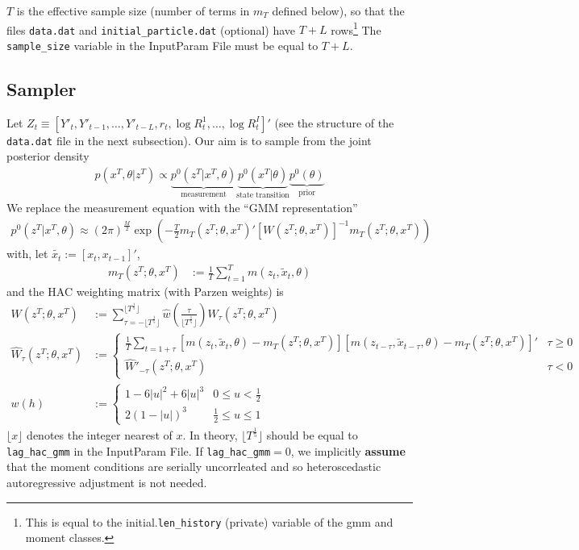 \documentclass[11pt, letterpaper, notitlepage]{article}
\begin{document}
$T$ is the effective sample size (number of terms in $m_T$ defined below), so that the files \texttt{data.dat} and \texttt{initial\_particle.dat} (optional) have $T+L$ rows\footnote{This is equal to the initial.\texttt{len\_history} (private) variable of the gmm and moment classes.} The \texttt{sample\_size} variable in the InputParam File must be equal to $T+L$.

\pagebreak 

\subsection{Sampler}

\noindent Let $Z_t \equiv [Y'_{t}, Y'_{t-1}, \dots, Y'_{t-L}, r_t, \log R_{t}^1, \dots, \log R_{t}^I]'$ (see the structure of the \texttt{data.dat} file in the next subsection). Our aim is to sample from the joint posterior density 
\begin{align*}
p(x^T, \theta | z^T) \propto \underbrace{p^0(z^T | x^T, \theta)}_{\text{measurement}}\underbrace{p^0(x^T|\theta)}_{\text{state transition}}\underbrace{p^0(\theta)}_{\text{prior}}
\end{align*}
We replace the measurement equation with the ``GMM representation''
\begin{align*}
p^0(z^T | x^T, \theta) \approx (2\pi)^{\frac{M}{2}}\exp\left(-\frac{T}{2} m_T(z^T; \theta, x^T)'[W(z^T;\theta, x^T)]^{-1}m_T(z^T; \theta, x^T)\right)
\end{align*}
with, let $\tilde{x_t}:=[x_t, x_{t-1}]'$, 
\begin{align*}
m_T(z^T; \theta, x^T) &:=  \frac{1}{T}\sum_{t=1}^T m(z_t, \tilde{x}_t, \theta) 
\end{align*}
and the HAC weighting matrix (with Parzen weights) is
\begin{align*}
W(z^T;\theta, x^T) &:= \sum_{\tau = - \lfloor T^{\frac{1}{5}}\rfloor}^{\lfloor T^{\frac{1}{5}}\rfloor} \widehat w\left(\frac{\tau}{\lfloor T^{\frac{1}{5}}\rfloor}\right)W_{\tau}(z^T; \theta, x^T) \\
\widehat W_{\tau}(z^T; \theta, x^T) &:= \left\{ \begin{array}{ll}
\frac{1}{T}\sum_{t=1+\tau}\left[m(z_t, \tilde{x}_t, \theta) - m_T(z^T; \theta, x^T)\right]\left[m(z_{t-\tau}, \tilde{x}_{t-\tau}, \theta) - m_T(z^T; \theta, x^T)\right]' & \tau\geq 0 \\
\widehat W'_{-\tau}(z^T; \theta, x^T) & \tau<0
\end{array}\right. \\
w(h) &:= \left\{ \begin{array}{ll}
1 - 6|u|^2 + 6|u|^3 & 0 \leq u < \frac{1}{2} \\
2(1-|u|)^3 & \frac{1}{2}\leq u \leq 1
\end{array}\right. 
\end{align*}
$\lfloor x \rfloor$ denotes the integer nearest of $x$. In theory, $\lfloor T^{\frac{1}{5}} \rfloor$ should be equal to \texttt{lag\_hac\_gmm} in the InputParam File. If \texttt{lag\_hac\_gmm}$=0$, we implicitly \textbf{assume} that the moment conditions are serially uncorrleated and so heteroscedastic autoregressive adjustment is not needed. 
\end{document}
